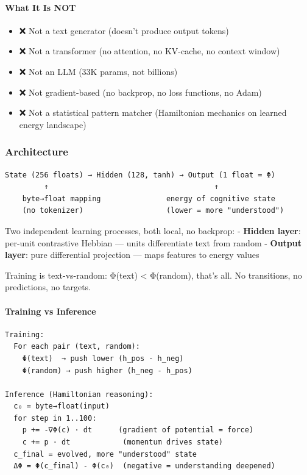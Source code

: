 \documentclass[
  11pt,
  a4paper,
]{article}
\providecommand{\tightlist}{%
  \setlength{\itemsep}{0pt}\setlength{\parskip}{0pt}}
\begin{document}
\paragraph{What It Is NOT}\label{what-it-is-not}

\begin{itemize}
\tightlist
\item
  ❌ Not a text generator (doesn't produce output tokens)
\item
  ❌ Not a transformer (no attention, no KV-cache, no context window)
\item
  ❌ Not an LLM (33K params, not billions)
\item
  ❌ Not gradient-based (no backprop, no loss functions, no Adam)
\item
  ❌ Not a statistical pattern matcher (Hamiltonian mechanics on learned
  energy landscape)
\end{itemize}

\subsubsection{Architecture}\label{architecture-1}

\begin{verbatim}
State (256 floats) → Hidden (128, tanh) → Output (1 float = Φ)
         ↑                                      ↑
    byte→float mapping               energy of cognitive state
    (no tokenizer)                   (lower = more "understood")
\end{verbatim}

Two independent learning processes, both local, no backprop: -
\textbf{Hidden layer}: per-unit contrastive Hebbian --- units
differentiate text from random - \textbf{Output layer}: pure
differential projection --- maps features to energy values

Training is text-vs-random: Φ(text) \textless{} Φ(random), that's all.
No transitions, no predictions, no targets.

\paragraph{Training vs Inference}\label{training-vs-inference}

\begin{verbatim}
Training:
  For each pair (text, random):
    Φ(text)  → push lower (h_pos - h_neg)
    Φ(random) → push higher (h_neg - h_pos)

Inference (Hamiltonian reasoning):
  c₀ = byte→float(input)
  for step in 1..100:
    p += -∇Φ(c) · dt      (gradient of potential = force)
    c += p · dt            (momentum drives state)
  c_final = evolved, more "understood" state
  ΔΦ = Φ(c_final) - Φ(c₀)  (negative = understanding deepened)
\end{verbatim}
\end{document}
